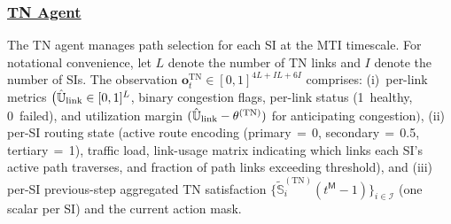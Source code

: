 \documentclass[12pt,lettersize,journal,onecolumn]{IEEEtran}
\begin{document}
\subsubsection{\underline{TN Agent}} \label{subsubsec:pomdp-tn}
The TN agent manages path selection for each SI at the MTI timescale. For notational convenience, let $L$ denote the number of TN links and $I$ denote the number of SIs. The observation $\mathbf{o}^{\text{TN}}_t \in [0,1]^{4L + IL + 6I}$ comprises: 
(i)~per-link metrics $\bigl(\mathbb{\Hat{U}}_{\text{link}}\in[0,1]^{L}$, binary congestion flags, per-link status (1~healthy, 0~failed), and utilization margin $(\mathbb{\Hat{U}}_{\text{link}}-\theta^{(\mathrm{TN})})$ for anticipating congestion$\bigr)$, 
(ii) per-SI routing state (active route encoding (primary\,$=$\,0, secondary\,$=$\,0.5, tertiary\,$=$\,1), traffic load, link-usage matrix indicating which links each SI's active path traverses, and fraction of path links exceeding threshold), and 
(iii) per-SI previous-step aggregated TN satisfaction $\{\tilde{\mathbb{S}}^{\mathrm{(TN)}}_{i}(t^\mathsf{M}-1)\}_{i\in\mathcal{I}}$ (one scalar per SI) and the current action mask.
\end{document}
